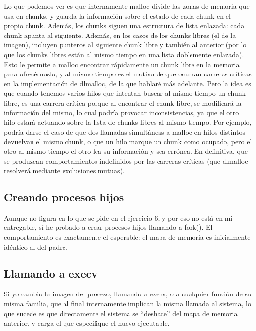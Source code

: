 \documentclass[a4paper]{article}
\begin{document}
Lo que podemos ver es que internamente {\ttfamily malloc} divide las zonas de memoria que usa en chunks, y guarda la información sobre el estado de cada chunk en el propio chunk. Además, los chunks siguen una estructura de lista enlazada: cada chunk apunta al siguiente. Además, en los casos de los chunks libres (el de la imagen), incluyen punteros al siguiente chunk libre y también al anterior (por lo que los chunks libres están al mismo tiempo en una lista doblemente enlazada). Esto le permite a {\ttfamily malloc} encontrar rápidamente un chunk libre en la memoria para ofrecérnoslo, y al mismo tiempo es el motivo de que ocurran carreras críticas en la implementación de {\ttfamily dlmalloc}, de la que hablaré más adelante. Pero la idea es que cuando tenemos varios hilos que intentan buscar al mismo tiempo un chunk libre, es una carrera crítica porque al encontrar el chunk libre, se modificará la información del mismo, lo cual podría provocar inconsistencias, ya que el otro hilo estará actuando sobre la lista de chunks libres al mismo tiempo. Por ejemplo, podría darse el caso de que dos llamadas simultáneas a {\ttfamily malloc} en hilos distintos devuelvan el mismo chunk, o que un hilo marque un chunk como ocupado, pero el otro al mismo tiempo el otro lea su información y sea errónea. En definitiva, que se produzcan comportamientos indefinidos por las carreras críticas (que {\ttfamily dlmalloc} resolverá mediante exclusiones mutuas).

\subsection{Creando procesos hijos}

Aunque no figura en lo que se pide en el ejercicio 6, y por eso no está en mi entregable, sí he probado a crear procesos hijos llamando a {\ttfamily fork()}. El comportamiento es exactamente el esperable: el mapa de memoria es inicialmente idéntico al del padre.

\subsection{Llamando a {\ttfamily execv}}

Si yo cambio la imagen del proceso, llamando a {\ttfamily execv}, o a cualquier función de su misma familia, que al final internamente implican la misma llamada al sistema, lo que sucede es que directamente el sistema se ``deshace'' del mapa de memoria anterior, y carga el que especifique el nuevo ejecutable.
\end{document}
